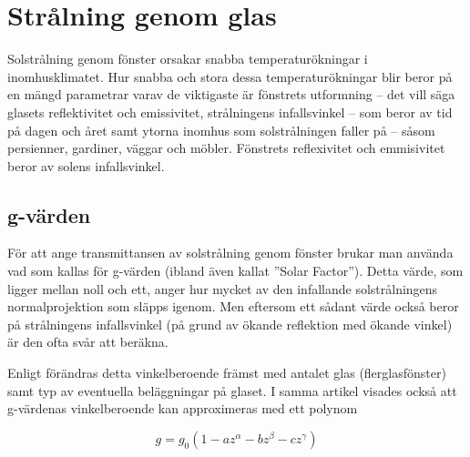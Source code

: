 \section{Strålning genom glas}
\label{sec:sunthroughwindows}
Solstrålning genom fönster orsakar snabba temperaturökningar i inomhusklimatet. Hur snabba och stora dessa temperaturökningar blir beror på en mängd parametrar varav de viktigaste är fönstrets utformning – det vill säga glasets reflektivitet och emissivitet, strålningens infallsvinkel – som beror av tid på dagen och året samt ytorna inomhus som solstrålningen faller på – såsom persienner, gardiner, väggar och möbler. Fönstrets reflexivitet och emmisivitet beror av solens infallsvinkel.


\subsection{g-värden}\label{gvalue}

För att ange transmittansen av solstrålning genom fönster brukar man använda vad som kallas för g-värden (ibland även kallat ''Solar Factor''). Detta värde, som ligger mellan noll och ett, anger hur mycket av den infallande solstrålningens normalprojektion som släpps igenom. Men eftersom ett sådant värde också beror på strålningens infallsvinkel (på grund av ökande reflektion med ökande vinkel) är den ofta svår att beräkna.

Enligt \cite{karlssonroos99} förändras detta vinkelberoende främst med antalet glas (flerglasfönster) samt typ av eventuella beläggningar på glaset. I samma artikel visades också att g-värdenas vinkelberoende kan approximeras med ett polynom

\begin{equation}\label{eq:radiationwindowstheory:gvalue}
g = g_0 \left( 1 - az^{\alpha} - bz^{\beta} - cz^{\gamma} \right)
\end{equation}

